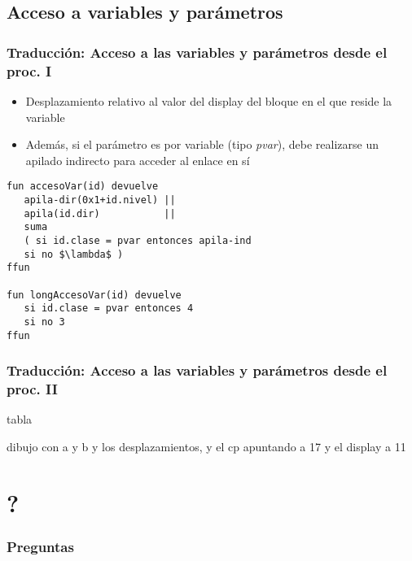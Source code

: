 \documentclass[hyperref={pdfpagelabels=false},tree-dvips,compress]{beamer}
\begin{document}
\subsection{Acceso a variables y parámetros}
\begin{frame}[fragile]
\frametitle{Traducción: Acceso a las variables y parámetros desde el proc. I}

\begin{itemize}
	\item Desplazamiento relativo al valor del display del bloque en el que reside la variable
	\item Además, si el parámetro es por variable (tipo \emph{pvar}), debe realizarse un apilado indirecto para acceder al enlace en sí
\end{itemize}

\begin{lstlisting}[style=codigoMP,basicstyle=\footnotesize\ttfamily,mathescape]
fun accesoVar(id) devuelve
   apila-dir(0x1+id.nivel) ||
   apila(id.dir)           ||
   suma
   ( si id.clase = pvar entonces apila-ind
   si no $\lambda$ )
ffun

fun longAccesoVar(id) devuelve
   si id.clase = pvar entonces 4
   si no 3
ffun
\end{lstlisting}

\end{frame}
\begin{frame}[fragile]
\frametitle{Traducción: Acceso a las variables y parámetros desde el proc. II}

tabla

dibujo con a y b y los desplazamientos, y el cp apuntando a 17 y el display a 11

\end{frame}
\section{?}
\begin{frame}[fragile]
\frametitle{Preguntas}
	\begin{center}
	\end{center}
\end{frame}
\end{document}
